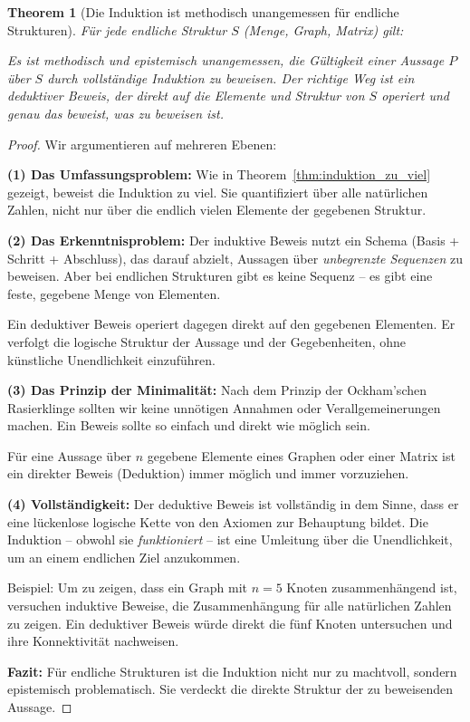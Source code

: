 \documentclass[12pt, a4paper]{article}
\newtheorem{theorem}{Theorem}[section]
\theoremstyle{definition}
\theoremstyle{remark}
\begin{document}
\begin{theorem}[Die Induktion ist methodisch unangemessen für endliche Strukturen]
\label{thm:induktion_unangemessen}
Für jede endliche Struktur $S$ (Menge, Graph, Matrix) gilt:

Es ist methodisch und epistemisch unangemessen, die Gültigkeit einer Aussage $P$ über $S$ durch vollständige Induktion zu beweisen. Der richtige Weg ist ein \emph{deduktiver Beweis}, der direkt auf die Elemente und Struktur von $S$ operiert und genau das beweist, was zu beweisen ist.
\end{theorem}

\begin{proof}
Wir argumentieren auf mehreren Ebenen:

\textbf{(1) Das Umfassungsproblem:} Wie in Theorem~\ref{thm:induktion_zu_viel} gezeigt, beweist die Induktion zu viel. Sie quantifiziert über alle natürlichen Zahlen, nicht nur über die endlich vielen Elemente der gegebenen Struktur.

\textbf{(2) Das Erkenntnisproblem:} Der induktive Beweis nutzt ein Schema (Basis + Schritt + Abschluss), das darauf abzielt, Aussagen über \emph{unbegrenzte Sequenzen} zu beweisen. Aber bei endlichen Strukturen gibt es keine Sequenz -- es gibt eine feste, gegebene Menge von Elementen.

Ein deduktiver Beweis operiert dagegen direkt auf den gegebenen Elementen. Er verfolgt die logische Struktur der Aussage und der Gegebenheiten, ohne künstliche Unendlichkeit einzuführen.

\textbf{(3) Das Prinzip der Minimalität:} Nach dem Prinzip der Ockham'schen Rasierklinge sollten wir keine unnötigen Annahmen oder Verallgemeinerungen machen. Ein Beweis sollte so einfach und direkt wie möglich sein.

Für eine Aussage über $n$ gegebene Elemente eines Graphen oder einer Matrix ist ein direkter Beweis (Deduktion) immer möglich und immer vorzuziehen.

\textbf{(4) Vollständigkeit:} Der deduktive Beweis ist vollständig in dem Sinne, dass er eine lückenlose logische Kette von den Axiomen zur Behauptung bildet. Die Induktion -- obwohl sie \emph{funktioniert} -- ist eine Umleitung über die Unendlichkeit, um an einem endlichen Ziel anzukommen.

Beispiel: Um zu zeigen, dass ein Graph mit $n=5$ Knoten zusammenhängend ist, versuchen induktive Beweise, die Zusammenhängung für alle natürlichen Zahlen zu zeigen. Ein deduktiver Beweis würde direkt die fünf Knoten untersuchen und ihre Konnektivität nachweisen.

\textbf{Fazit:} Für endliche Strukturen ist die Induktion nicht nur zu machtvoll, sondern epistemisch problematisch. Sie verdeckt die direkte Struktur der zu beweisenden Aussage.
\end{proof}
\end{document}
